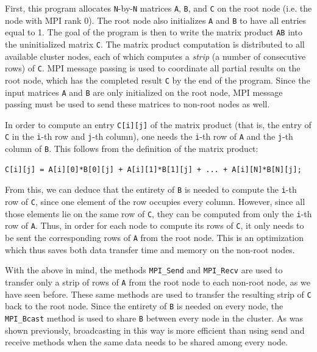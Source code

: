 \documentclass{article}
\theoremstyle{definition}
\begin{document}
First, this program allocates \texttt{N}-by-\texttt{N} matrices \texttt{A}, \texttt{B}, and \texttt{C} on the root node (i.e. the node with MPI rank 0). The root node also initializes \texttt{A} and \texttt{B} to have all entries equal to 1. The goal of the program is then to write the matrix product \texttt{AB} into the uninitialized matrix \texttt{C}. The matrix product computation is distributed to all available cluster nodes, each of which computes a \emph{strip} (a number of consecutive rows) of \texttt{C}. MPI message passing is used to coordinate all partial results on the root node, which has the completed result \texttt{C} by the end of the program. Since the input matrices \texttt{A} and \texttt{B} are only initialized on the root node, MPI message passing must be used to send these matrices to non-root nodes as well. 

In order to compute an entry \texttt{C[i][j]} of the matrix product (that is, the entry of \texttt{C} in the \texttt{i}-th row and \texttt{j}-th column), one needs the \texttt{i}-th row of \texttt{A} and the \texttt{j}-th column of \texttt{B}. This follows from the definition of the matrix product:

\begin{verbatim}
C[i][j] = A[i][0]*B[0][j] + A[i][1]*B[1][j] + ... + A[i][N]*B[N][j];
\end{verbatim}

From this, we can deduce that the entirety of \texttt{B} is needed to compute the \texttt{i}-th row of \texttt{C}, since one element of the row occupies every column. However, since all those elements lie on the same row of \texttt{C}, they can be computed from only the \texttt{i}-th row of \texttt{A}. Thus, in order for each node to compute its rows of \texttt{C}, it only needs to be sent the corresponding rows of \texttt{A} from the root node. This is an optimization which thus saves both data transfer time and memory on the non-root nodes.

With the above in mind, the methods \texttt{MPI\_Send} and \texttt{MPI\_Recv} are used to transfer only a strip of rows of \texttt{A} from the root node to each non-root node, as we have seen before. These same methods are used to transfer the resulting strip of \texttt{C} back to the root node. Since the entirety of \texttt{B} is needed on every node, the \texttt{MPI\_Bcast} method is used to share \texttt{B} between every node in the cluster. As was shown previously, broadcasting in this way is more efficient than using send and receive methods when the same data needs to be shared among every node.
\end{document}
